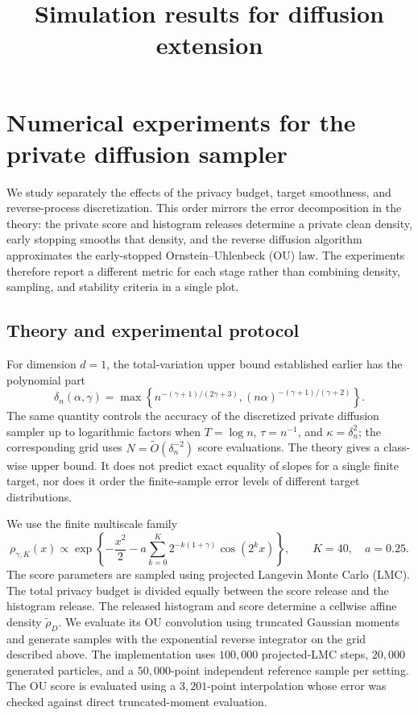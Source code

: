 \documentclass[11pt]{article}
\title{Simulation results for diffusion extension}
\author{}
\date{}
\begin{document}
\maketitle

\providecommand{\DiffusionFigRoot}{.}

\section{Numerical experiments for the private diffusion sampler}
\label{sec:diffusion-experiments}

We study separately the effects of the privacy budget, target smoothness, and
reverse-process discretization.  This order mirrors the error decomposition in
the theory: the private score and histogram releases determine a private clean
density, early stopping smooths that density, and the reverse diffusion
algorithm approximates the early-stopped Ornstein--Uhlenbeck (OU) law.  The
experiments therefore report a different metric for each stage rather than
combining density, sampling, and stability criteria in a single plot.

\subsection{Theory and experimental protocol}
\label{sec:diffusion-experimental-protocol}

For dimension $d=1$, the total-variation upper bound established earlier has
the polynomial part
\begin{equation}
  \delta_n(\alpha,\gamma)
  = \max\left\{
      n^{-(\gamma+1)/(2\gamma+3)},
      (n\alpha)^{-(\gamma+1)/(\gamma+2)}
    \right\}.
  \label{eq:experiment-delta}
\end{equation}
The same quantity controls the accuracy of the discretized private diffusion
sampler up to logarithmic factors when
$T=\log n$, $\tau=n^{-1}$, and $\kappa=\delta_n^2$; the corresponding grid uses
$N=\widetilde O(\delta_n^{-2})$ score evaluations.  The theory gives a
class-wise upper bound.  It does not predict exact equality of slopes for a
single finite target, nor does it order the finite-sample error levels of
different target distributions.

We use the finite multiscale family
\begin{equation}
  \rho_{\gamma,K}(x) \propto
  \exp\left\{-\frac{x^2}{2}
  - a\sum_{k=0}^{K}2^{-k(1+\gamma)}\cos(2^k x)\right\},
  \qquad K=40,\quad a=0.25.
  \label{eq:multiscale-target}
\end{equation}
The score parameters are sampled using projected Langevin Monte Carlo (LMC).  The total privacy budget is divided equally
between the score release and the histogram release.  The released histogram
and score determine a cellwise affine density $\widetilde\rho_D$.  We evaluate
its OU convolution using truncated Gaussian moments and generate samples with
the exponential reverse integrator on the grid described above.  The
implementation uses $100{,}000$ projected-LMC steps, $20{,}000$ generated
particles, and a $50{,}000$-point independent reference sample per setting.
The OU score is evaluated using a $3{,}201$-point interpolation whose error was
checked against direct truncated-moment evaluation.
\end{document}
